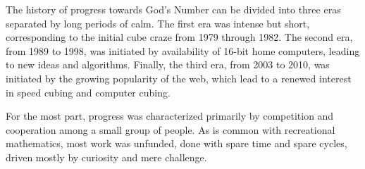 The history of
progress towards God's Number can be divided into three eras separated
by long periods of calm.  The first era was intense but short,
corresponding to the initial cube craze from 1979 through 1982.
The second era, from 1989 to 1998, was
initiated by availability of 16-bit home computers, leading to new
ideas and algorithms.  Finally, the third era, from 2003 to 2010,
was initiated by the growing popularity of the web,
which lead to a renewed interest in speed cubing and computer
cubing.

For the most part, progress was characterized primarily by competition
and cooperation among a small group of people.  As is common with
recreational mathematics, most work was unfunded, done with spare
time and spare cycles, driven mostly by curiosity and mere
challenge.
\bye
